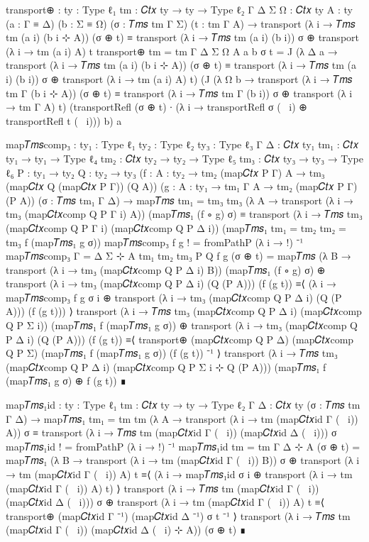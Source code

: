 \begin{code}[hide]
transport⊕ : {ty : Type ℓ₁} {tm : 𝐶𝑡𝑥 ty → ty → Type ℓ₂} {Γ Δ Σ Ω : 𝐶𝑡𝑥 ty} {A : ty}
  (a : Γ ≡ Δ) (b : Σ ≡ Ω) (σ : 𝑇𝑚𝑠 tm Γ Σ) (t : tm Γ A) →
  transport (λ i → 𝑇𝑚𝑠 tm (a i) (b i ⊹ A)) (σ ⊕ t)
    ≡ transport (λ i → 𝑇𝑚𝑠 tm (a i) (b i)) σ ⊕ transport (λ i → tm (a i) A) t
transport⊕ {tm = tm} {Γ} {Δ} {Σ} {Ω} {A} a b σ t =
  J (λ Δ a → transport (λ i → 𝑇𝑚𝑠 tm (a i) (b i ⊹ A)) (σ ⊕ t)
    ≡ transport (λ i → 𝑇𝑚𝑠 tm (a i) (b i)) σ ⊕ transport (λ i → tm (a i) A) t)
    (J (λ Ω b →  transport (λ i → 𝑇𝑚𝑠 tm Γ (b i ⊹ A)) (σ ⊕ t) ≡
      transport (λ i → 𝑇𝑚𝑠 tm Γ (b i)) σ ⊕ transport (λ i → tm Γ A) t)
      (transportRefl (σ ⊕ t) ∙ (λ i → transportRefl σ (~ i) ⊕ transportRefl t (~ i))) b) a

map𝑇𝑚𝑠comp₃ : {ty₁ : Type ℓ₁} {ty₂ : Type ℓ₂} {ty₃ : Type ℓ₃} {Γ Δ : 𝐶𝑡𝑥 ty₁}
  {tm₁ : 𝐶𝑡𝑥 ty₁ → ty₁ → Type ℓ₄} {tm₂ : 𝐶𝑡𝑥 ty₂ → ty₂ → Type ℓ₅} {tm₃ : 𝐶𝑡𝑥 ty₃ → ty₃ → Type ℓ₆}
  {P : ty₁ → ty₂} {Q : ty₂ → ty₃}
  (f : {A : ty₂} → tm₂ (map𝐶𝑡𝑥 P Γ) A → tm₃ (map𝐶𝑡𝑥 Q (map𝐶𝑡𝑥 P Γ)) (Q A))
  (g : {A : ty₁} → tm₁ Γ A → tm₂ (map𝐶𝑡𝑥 P Γ) (P A))
  (σ : 𝑇𝑚𝑠 tm₁ Γ Δ) →
  map𝑇𝑚𝑠 {tm₁ = tm₃} {tm₃} (λ {A} → transport (λ i → tm₃ (map𝐶𝑡𝑥comp Q P Γ i) A))
    (map𝑇𝑚𝑠₁ (f ∘ g) σ)
  ≡ transport (λ i → 𝑇𝑚𝑠 tm₃ (map𝐶𝑡𝑥comp Q P Γ i) (map𝐶𝑡𝑥comp Q P Δ i))
    (map𝑇𝑚𝑠₁ {tm₁ = tm₂} {tm₂ = tm₃} f (map𝑇𝑚𝑠₁ g σ))
map𝑇𝑚𝑠comp₃ f g ! = fromPathP (λ i → !) ⁻¹
map𝑇𝑚𝑠comp₃ {Γ = Δ} {Σ ⊹ A} {tm₁} {tm₂} {tm₃} {P} {Q} f g (σ ⊕ t) =
  map𝑇𝑚𝑠 (λ {B} → transport (λ i → tm₃ (map𝐶𝑡𝑥comp Q P Δ i) B)) (map𝑇𝑚𝑠₁ (f ∘ g) σ)
    ⊕ transport (λ i → tm₃ (map𝐶𝑡𝑥comp Q P Δ i) (Q (P A))) (f (g t))
    ≡⟨ (λ i → map𝑇𝑚𝑠comp₃ f g σ i
      ⊕ transport (λ i → tm₃ (map𝐶𝑡𝑥comp Q P Δ i) (Q (P A))) (f (g t))) ⟩
  transport (λ i → 𝑇𝑚𝑠 tm₃ (map𝐶𝑡𝑥comp Q P Δ i) (map𝐶𝑡𝑥comp Q P Σ i)) (map𝑇𝑚𝑠₁ f (map𝑇𝑚𝑠₁ g σ))
    ⊕ transport (λ i → tm₃ (map𝐶𝑡𝑥comp Q P Δ i) (Q (P A))) (f (g t))
    ≡⟨ transport⊕ (map𝐶𝑡𝑥comp Q P Δ) (map𝐶𝑡𝑥comp Q P Σ) (map𝑇𝑚𝑠₁ f (map𝑇𝑚𝑠₁ g σ)) (f (g t)) ⁻¹ ⟩
  transport (λ i → 𝑇𝑚𝑠 tm₃ (map𝐶𝑡𝑥comp Q P Δ i) (map𝐶𝑡𝑥comp Q P Σ i ⊹ Q (P A)))
    (map𝑇𝑚𝑠₁ f (map𝑇𝑚𝑠₁ g σ) ⊕ f (g t))
    ∎

map𝑇𝑚𝑠₁id : {ty : Type ℓ₁} {tm : 𝐶𝑡𝑥 ty → ty → Type ℓ₂} {Γ Δ : 𝐶𝑡𝑥 ty} (σ : 𝑇𝑚𝑠 tm Γ Δ) →
  map𝑇𝑚𝑠₁ {tm₁ = tm} {tm} (λ {A} → transport (λ i → tm (map𝐶𝑡𝑥id Γ (~ i)) A)) σ
  ≡ transport (λ i → 𝑇𝑚𝑠 tm (map𝐶𝑡𝑥id Γ (~ i)) (map𝐶𝑡𝑥id Δ (~ i))) σ
map𝑇𝑚𝑠₁id ! = fromPathP (λ i → !) ⁻¹
map𝑇𝑚𝑠₁id {tm = tm} {Γ} {Δ ⊹ A} (σ ⊕ t) =
  map𝑇𝑚𝑠₁ (λ {B} → transport (λ i → tm (map𝐶𝑡𝑥id Γ (~ i)) B)) σ
    ⊕ transport (λ i → tm (map𝐶𝑡𝑥id Γ (~ i)) A) t
    ≡⟨ (λ i → map𝑇𝑚𝑠₁id σ i ⊕ transport (λ i → tm (map𝐶𝑡𝑥id Γ (~ i)) A) t) ⟩
  transport (λ i → 𝑇𝑚𝑠 tm (map𝐶𝑡𝑥id Γ (~ i)) (map𝐶𝑡𝑥id Δ (~ i))) σ
    ⊕ transport (λ i → tm (map𝐶𝑡𝑥id Γ (~ i)) A) t
    ≡⟨ transport⊕ (map𝐶𝑡𝑥id Γ ⁻¹) (map𝐶𝑡𝑥id Δ ⁻¹) σ t ⁻¹ ⟩
  transport (λ i → 𝑇𝑚𝑠 tm (map𝐶𝑡𝑥id Γ (~ i)) (map𝐶𝑡𝑥id Δ (~ i) ⊹ A)) (σ ⊕ t)
    ∎


\end{code}
